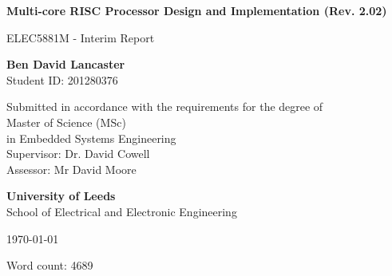 \documentclass[11pt,a4paper]{report}
\begin{document}
\pagestyle{headings}

\begin{titlepage}
\begin{center}

\vspace*{2cm}
\Large

\textbf{
Multi-core RISC Processor Design and Implementation (Rev. 2.02)
}

\vspace{0.4cm}
\large
ELEC5881M - Interim Report

\vspace{2cm}
\textbf{Ben David Lancaster}\\
Student ID: 201280376

\vspace{2cm}
Submitted in accordance with the requirements for the degree of\\
Master of Science (MSc)\\
in Embedded Systems Engineering\\

\vspace{2cm}
Supervisor: Dr. David Cowell\\
Assessor: Mr David Moore

\vspace{2cm}
\textbf{University of Leeds}\\
School of Electrical and Electronic Engineering

\vspace{2cm}
\today

\vspace{2cm}
Word count: 4689
\end{center}
\end{titlepage}

\end{document}
